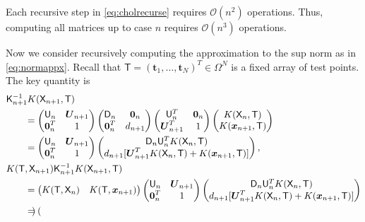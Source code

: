 \documentclass[]{mcom-l}
\theoremstyle{remark}
\newcommand{\mD}{\mathsf{D}}
\newcommand{\mK}{\mathsf{K}}
\newcommand{\mT}{\mathsf{T}}
\newcommand{\mU}{\mathsf{U}}
\newcommand{\mX}{\mathsf{X}}
\newcommand{\bzero}{\boldsymbol{0}}
\newcommand{\bx}{{\boldsymbol{x}}}
\newcommand{\bt}{{\boldsymbol{t}}}
\newcommand{\bU}{{\boldsymbol{U}}}
\newcommand{\cx}{{\Omega}}
\newcommand{\Order}{\mathcal{O}}
\begin{document}
Each recursive step in  \eqref{eq:cholrecurse} requires $\Order(n^2)$ operations.  Thus, computing all matrices up to case $n$ requires  $\Order(n^3)$ operations.


Now we consider recursively computing the approximation to the sup norm as in \eqref{eq:normappx}.   Recall that $\mT = (\bt_1, \ldots, \bt_N)^T \in \cx^N$ is a fixed array of test points.  The key quantity is 
\begin{align*}
\MoveEqLeft{\mK_{n+1}^{-1} K(\mX_{n+1},\mT)} \\
& = 
\begin{pmatrix}
\mU_n & \bU_{n+1} \\
\bzero^T_n & 1
\end{pmatrix}
\begin{pmatrix}
\mD_n & \bzero_n \\
\bzero^T_n & d_{n+1}
\end{pmatrix}
\begin{pmatrix}
\mU_n^T & \bzero_n \\
\bU_{n+1}^T & 1
\end{pmatrix}
\begin{pmatrix}
K(\mX_n,\mT)  \\
K(\bx_{n+1},\mT)
\end{pmatrix} \\
& = 
\begin{pmatrix}
\mU_n & \bU_{n+1} \\
\bzero^T_n & 1
\end{pmatrix}
\begin{pmatrix}
\mD_n\mU_n^T  K(\mX_n,\mT) \\
d_{n+1}[ \bU_{n+1}^T K(\mX_n,\mT) + K(\bx_{n+1},\mT) ]
\end{pmatrix}, \\
\MoveEqLeft{K(\mT,\mX_{n+1}) \mK_{n+1}^{-1} K(\mX_{n+1},\mT)} \\
& = \begin{pmatrix}
K(\mT, \mX_n)  &
K(\mT, \bx_{n+1})
\end{pmatrix} 
\begin{pmatrix}
\mU_n & \bU_{n+1} \\
\bzero^T_n & 1
\end{pmatrix}
\begin{pmatrix}
\mD_n\mU_n^T  K(\mX_n,\mT) \\
d_{n+1}[ \bU_{n+1}^T K(\mX_n,\mT) + K(\bx_{n+1},\mT) ]
\end{pmatrix}
\\
&= 
\begin{pmatrix}

\end{pmatrix}
\end{align*}
\end{document}
